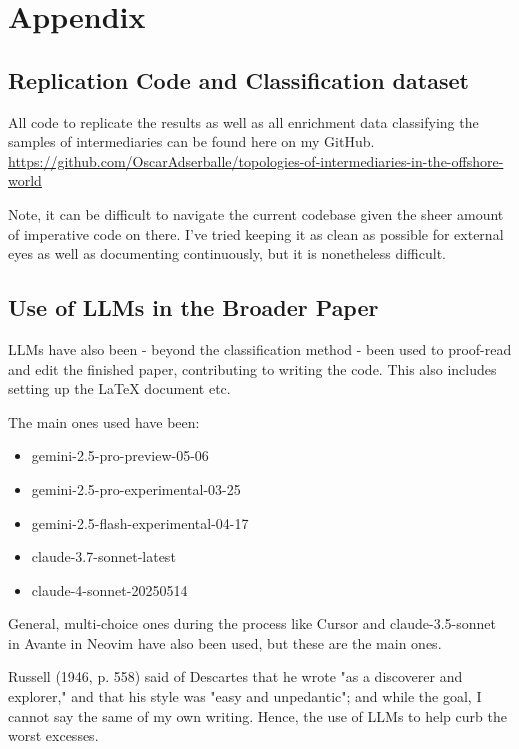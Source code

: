 \chapter{Appendix}
\label{chap:appendix}

\section{Replication Code and Classification dataset}

All code to replicate the results as well as all enrichment data classifying the samples of intermediaries can be found here on my GitHub. \href{https://github.com/OscarAdserballe/topologies-of-intermediaries-in-the-offshore-world}{https://github.com/OscarAdserballe/topologies-of-intermediaries-in-the-offshore-world}

Note, it can be difficult to navigate the current codebase given the sheer amount of imperative code on there. I've tried keeping it as clean as possible for external eyes as well as documenting continuously, but it is nonetheless difficult.

\newpage

\section{Use of LLMs in the Broader Paper}

LLMs have also been - beyond the classification method - been used to proof-read and edit the finished paper, contributing to writing the code. This also includes setting up the LaTeX document etc. 

The main ones used have been:

\begin{itemize}
    \item gemini-2.5-pro-preview-05-06
    \item gemini-2.5-pro-experimental-03-25
    \item gemini-2.5-flash-experimental-04-17
    \item claude-3.7-sonnet-latest
    \item claude-4-sonnet-20250514
\end{itemize}

General, multi-choice ones during the process like Cursor and claude-3.5-sonnet in Avante in Neovim have also been used, but these are the main ones.

Russell (1946, p. 558) said of Descartes that he wrote "as a discoverer and explorer," and that his style was "easy and unpedantic"; and while the goal, I cannot say the same of my own writing. Hence, the use of LLMs to help curb the worst excesses. 

